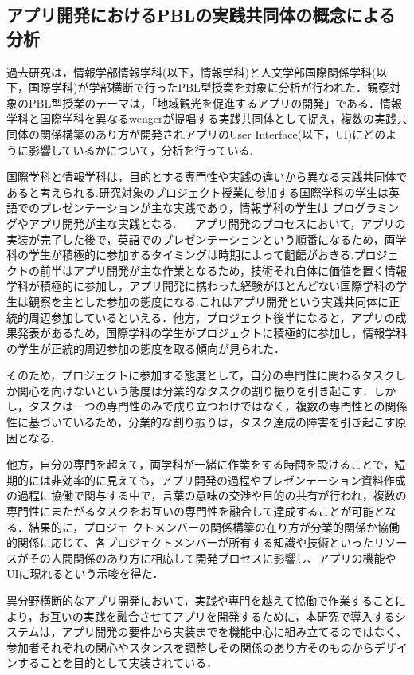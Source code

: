 \documentclass[submit,techrep]{ipsj}
\begin{document}
\subsection{アプリ開発におけるPBLの実践共同体の概念による分析}
過去研究は，情報学部情報学科(以下，情報学科)と人文学部国際関係学科(以下，国際学科)が学部横断で行ったPBL型授業を対象に分析が行われた．観察対象のPBL型授業のテーマは，「地域観光を促進するアプリの開発」である．情報学科と国際学科を異なるwengerが提唱する実践共同体として捉え，複数の実践共同体の関係構築のあり方が開発されアプリのUser Interface(以下，UI)にどのように影響しているかについて，分析を行っている\cite{book12}.

国際学科と情報学科は，目的とする専門性や実践の違いから異なる実践共同体であると考えられる.研究対象のプロジェクト授業に参加する国際学科の学生は英語でのプレゼンテーションが主な実践であり，情報学科の学生は プログラミングやアプリ開発が主な実践となる. 
　
アプリ開発のプロセスにおいて，アプリの実装が完了した後で，英語でのプレゼンテーションという順番になるため，両学科の学生が積極的に参加するタイミングは時期によって齟齬がおきる.プロジェクトの前半はアプリ開発が主な作業となるため，技術それ自体に価値を置く情報学科が積極的に参加し，アプリ開発に携わった経験がほとんどない国際学科の学生は観察を主とした参加の態度になる.これはアプリ開発という実践共同体に正統的周辺参加しているといえる．他方，プロジェクト後半になると，アプリの成果発表があるため，国際学科の学生がプロジェクトに積極的に参加し，情報学科の学生が正統的周辺参加の態度を取る傾向が見られた．

そのため，プロジェクトに参加する態度として，自分の専門性に関わるタスクしか関心を向けないという態度は分業的なタスクの割り振りを引き起こす．しかし，タスクは一つの専門性のみで成り立つわけではなく，複数の専門性との関係性に基づいているため，分業的な割り振りは，タスク達成の障害を引き起こす原因となる.

他方，自分の専門を超えて，両学科が一緒に作業をする時間を設けることで，短期的には非効率的に見えても，アプリ開発の過程やプレゼンテーション資料作成の過程に協働で関与する中で，言葉の意味の交渉や目的の共有が行われ，複数の専門性にまたがるタスクをお互いの専門性を融合して達成することが可能となる．結果的に，プロジェ クトメンバーの関係構築の在り方が分業的関係か協働的関係に応じて、各プロジェクトメンバーが所有する知識や技術といったリソースがその人間関係のあり方に相応して開発プロセスに影響し、アプリの機能やUIに現れるという示唆を得た．


異分野横断的なアプリ開発において，実践や専門を越えて協働で作業することにより，お互いの実践を融合させてアプリを開発するために，本研究で導入するシステムは，アプリ開発の要件から実装までを機能中心に組み立てるのではなく、参加者それぞれの関心やスタンスを調整しその関係のあり方そのものからデザインすることを目的として実装されている．
\end{document}
